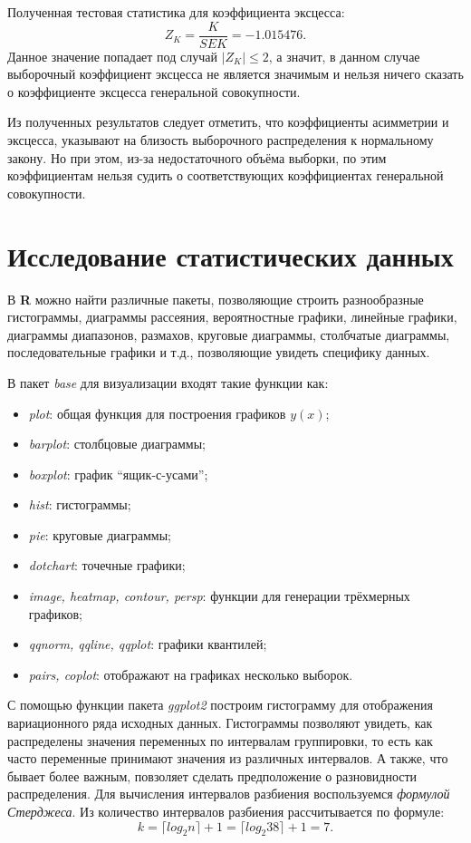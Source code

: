 Полученная тестовая статистика для коэффициента эксцесса:
\begin{equation*}
	Z_K = \frac{K}{SEK} = -1.015476.
\end{equation*}
Данное значение попадает под случай $\vert Z_K \vert \le 2$, а значит, в данном случае выборочный коэффициент эксцесса не является значимым и нельзя ничего сказать о коэффициенте эксцесса генеральной совокупности.

Из полученных результатов следует отметить, что коэффициенты асимметрии и эксцесса, указывают на близость выборочного распределения к нормальному закону. Но при этом, из-за недостаточного объёма выборки, по этим коэффициентам нельзя судить о соответствующих коэффициентах генеральной совокупности.


\section{Исследование статистических данных} %
\label{sec:analysis}

В \textbf{R} можно найти различные пакеты, позволяющие строить разнообразные гистограммы, диаграммы рассеяния, вероятностные графики, линейные графики, диаграммы диапазонов, размахов, круговые диаграммы, столбчатые диаграммы, последовательные графики и т.д., позволяющие увидеть специфику данных.

В пакет \textit{base} для визуализации входят такие функции как:
\begin{itemize}
	\item \textit{plot}: общая функция для построения графиков $y(x)$;
	\item \textit{barplot}: столбцовые диаграммы;
	\item \textit{boxplot}: график ``ящик-с-усами'';
	\item \textit{hist}: гистограммы;
	\item \textit{pie}: круговые диаграммы;
	\item \textit{dotchart}: точечные графики;
	\item \textit{image, heatmap, contour, persp}: функции для генерации трёхмерных графиков;
	\item \textit{qqnorm, qqline, qqplot}: графики квантилей;
	\item \textit{pairs, coplot}: отображают на графиках несколько выборок.
\end{itemize}

С помощью функции пакета \textit{ggplot2} построим гистограмму для отображения вариационного ряда исходных данных. Гистограммы позволяют увидеть, как распределены значения переменных по интервалам группировки, то есть как часто переменные принимают значения из различных интервалов. А также, что бывает более важным, повзоляет сделать предположение о разновидности распределения. Для вычисления интервалов разбиения воспользуемся \textit{формулой Стерджеса}. Из \cite{Sturges1926Choice} количество интервалов разбиения рассчитывается по формуле:
\begin{equation}
\label{eq:sturges}
	k = \lceil log_{2}n \rceil + 1 = \lceil log_{2}38 \rceil + 1 = 7.
\end{equation}

